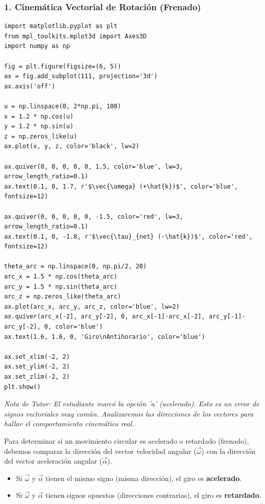 \documentclass[12pt, a4paper]{article}
\begin{document}
\subsubsection*{1. Cinemática Vectorial de Rotación (Frenado)}

\begin{verbatim}
import matplotlib.pyplot as plt
from mpl_toolkits.mplot3d import Axes3D
import numpy as np

fig = plt.figure(figsize=(6, 5))
ax = fig.add_subplot(111, projection='3d')
ax.axis('off')

u = np.linspace(0, 2*np.pi, 100)
x = 1.2 * np.cos(u)
y = 1.2 * np.sin(u)
z = np.zeros_like(u)
ax.plot(x, y, z, color='black', lw=2)

ax.quiver(0, 0, 0, 0, 0, 1.5, color='blue', lw=3, arrow_length_ratio=0.1)
ax.text(0.1, 0, 1.7, r'$\vec{\omega} (+\hat{k})$', color='blue', fontsize=12)

ax.quiver(0, 0, 0, 0, 0, -1.5, color='red', lw=3, arrow_length_ratio=0.1)
ax.text(0.1, 0, -1.8, r'$\vec{\tau}_{net} (-\hat{k})$', color='red', fontsize=12)

theta_arc = np.linspace(0, np.pi/2, 20)
arc_x = 1.5 * np.cos(theta_arc)
arc_y = 1.5 * np.sin(theta_arc)
arc_z = np.zeros_like(theta_arc)
ax.plot(arc_x, arc_y, arc_z, color='blue', lw=2)
ax.quiver(arc_x[-2], arc_y[-2], 0, arc_x[-1]-arc_x[-2], arc_y[-1]-arc_y[-2], 0, color='blue')
ax.text(1.6, 1.6, 0, 'Giro\nAntihorario', color='blue')

ax.set_xlim(-2, 2)
ax.set_ylim(-2, 2)
ax.set_zlim(-2, 2)
plt.show()
\end{verbatim}

\textit{Nota de Tutor: El estudiante marcó la opción 'a' (acelerado). Esto es un error de signos vectoriales muy común. Analizaremos las direcciones de los vectores para hallar el comportamiento cinemático real.}

Para determinar si un movimiento circular es acelerado o retardado (frenado), debemos comparar la dirección del vector velocidad angular ($\vec{\omega}$) con la dirección del vector aceleración angular ($\vec{\alpha}$).
\begin{itemize}
    \item Si $\vec{\omega}$ y $\vec{\alpha}$ tienen el mismo signo (misma dirección), el giro es \textbf{acelerado}.
    \item Si $\vec{\omega}$ y $\vec{\alpha}$ tienen signos opuestos (direcciones contrarias), el giro es \textbf{retardado}.
\end{itemize}
\end{document}
